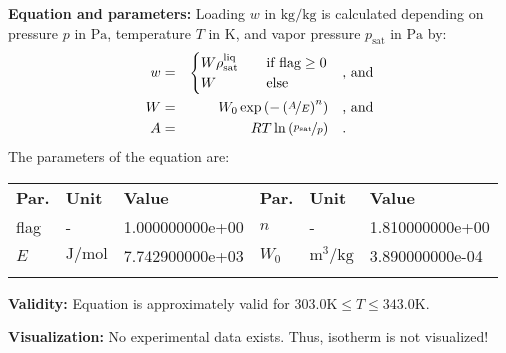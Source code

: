 \textbf{Equation and parameters:}
\newline
%
Loading $w$ in $\si{\kilogram\per\kilogram}$ is calculated depending on pressure $p$ in $\si{\pascal}$, temperature $T$ in $\si{\kelvin}$, and vapor pressure $p_\mathrm{sat}$ in $\si{\pascal}$ by:
%
\begin{equation*}
\begin{split}
w &=& \begin{cases} W \rho_\mathrm{sat}^{\mathrm{liq}} & \quad \text{if flag} \geq 0 \\ W & \quad \text{else} \end{cases} & \quad\text{, and} \\
W &=& W_0 \exp \left( - \left( \nicefrac{A}{E} \right) ^{n} \right) & \quad\text{, and} \\
A &=& R T \ln \left( \nicefrac{p_\mathrm{sat}}{p} \right) & \quad\text{.} \\
\end{split}
\end{equation*}
%
The parameters of the equation are:
%
\begin{longtable}[l]{lll|lll}
\toprule
\addlinespace
\textbf{Par.} & \textbf{Unit} & \textbf{Value} &	\textbf{Par.} & \textbf{Unit} & \textbf{Value} \\
\addlinespace
\midrule
\endhead

\bottomrule
\endfoot
\bottomrule
\endlastfoot
\addlinespace

flag & - & 1.000000000e+00 & $n$ & - & 1.810000000e+00 \\
$E$ & $\si{\joule\per\mole}$ & 7.742900000e+03 & $W_0$ & $\si{\cubic\meter\per\kilogram}$ & 3.890000000e-04 \\

\addlinespace\end{longtable}

\textbf{Validity:}
\newline
Equation is approximately valid for $303.0 \si{\kelvin} \leq T \leq 343.0 \si{\kelvin}$.
\newline

\textbf{Visualization:}
%
\newline
No experimental data exists. Thus, isotherm is not visualized!
%

\FloatBarrier
\newpage
